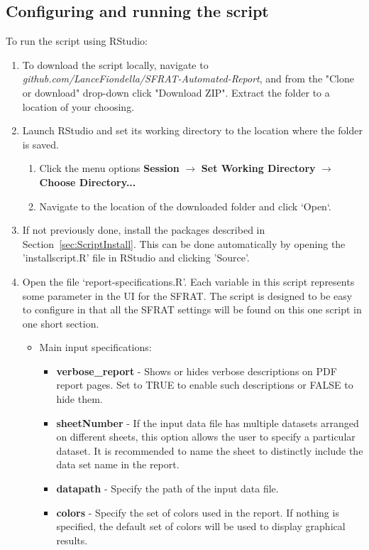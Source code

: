 \documentclass[conference]{IEEEtran}
\begin{document}
\subsection{Configuring and running the script}\label{sec:ScriptRun}
To run the script using RStudio:
\begin{enumerate}

  \item {To download the script locally, navigate to \textit{github.com/LanceFiondella/SFRAT-Automated-Report}, and from the "Clone or download" drop-down click "Download ZIP". Extract the folder to a location of your choosing.}
  \item {Launch RStudio and set its working directory to the location where the folder is saved.
  \begin{enumerate}
    \item {Click the menu options \textbf{Session} $\to$ \textbf{Set Working Directory} $\to$ \textbf{Choose Directory...}}
    \item {Navigate to the location of the downloaded folder and click `Open`.}
  \end{enumerate}
  }
  \item {If not previously done, install the packages described in Section~\ref{sec:ScriptInstall}. This can be done automatically by opening the 'installscript.R' file in RStudio and clicking 'Source'.}
  \item {Open the file `report-specifications.R’. Each variable in this script represents some parameter in the UI for the SFRAT. The script is designed to be easy to configure in that all the SFRAT settings will be found on this one script in one short section.
  \begin{itemize}
    \item {Main input specifications: 
    \begin{itemize}
    \item {\textbf{verbose\_report} - Shows or hides verbose descriptions on PDF report pages. Set to TRUE to enable such descriptions or FALSE to hide them.}
      \item {\textbf{sheetNumber} - If the input data file has multiple datasets arranged on different sheets, this option allows the user to specify a particular dataset. It is recommended to name the sheet to distinctly include the data set name in the report.}
      \item {\textbf{datapath} - Specify the path of the input data file.}
      \item {\textbf{colors} - Specify the set of colors used in the report. If nothing is specified, the default set of colors will be used to display graphical results.}

\end{itemize}}
\end{itemize}}
\end{enumerate}
\end{document}
